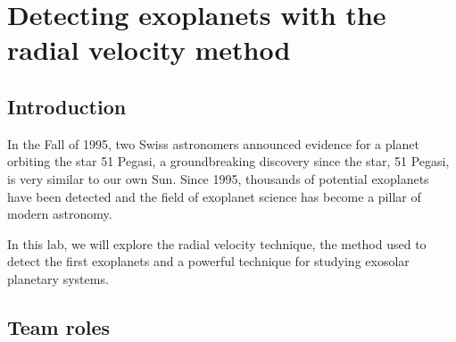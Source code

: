 \chapter{Detecting exoplanets with the radial velocity method}







\section{Introduction}

In the Fall of 1995, two Swiss astronomers announced evidence for a planet orbiting the star 51 Pegasi, a groundbreaking discovery since the star, 51 Pegasi, is very similar to our own Sun. Since 1995, thousands of potential exoplanets have been detected and the field of exoplanet science has become a pillar of modern astronomy.

In this lab, we will explore the radial velocity technique, the method used to detect the first exoplanets and a powerful technique for studying exosolar planetary systems.



\section{Team roles}

